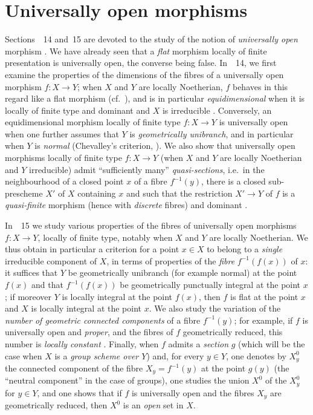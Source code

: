 \section{Universally open morphisms}
\label{section:IV.14}

Sections~\textsection\textsection~14 and~15 are devoted to the study of the notion of \emph{universally open} morphism .
We have already seen  that a \emph{flat} morphism locally of finite presentation is universally open, the converse being false.
In~\textsection~14, we first examine the properties of the dimensions of the fibres of a universally open morphism $f:X\to Y$; when $X$ and $Y$ are locally Noetherian, $f$ behaves in this regard  like a flat morphism (cf.~), and is in particular \emph{equidimensional} when it is locally of finite type and dominant and $X$ is irreducible .
Conversely, an equidimensional morphism locally of finite type $f:X\to Y$ is universally open when one further assumes that $Y$ is \emph{geometrically unibranch}, and in particular when $Y$ is \emph{normal} (Chevalley's criterion, ).
We also show that universally open morphisms locally of finite type $f:X\to Y$ (when $X$ and $Y$ are
locally Noetherian and $Y$ irreducible) admit ``sufficiently many'' \emph{quasi-sections}, i.e.\ in the neighbourhood of a closed point $x$ of a fibre $f^{-1}(y)$, there is a closed sub-prescheme $X'$ of $X$ containing $x$ and such that the restriction $X'\to Y$ of $f$ is a \emph{quasi-finite} morphism (hence with \emph{discrete} fibres) and dominant .

In~\textsection~15 we study various properties of the fibres of universally open morphisms $f:X\to Y$, locally of finite type, notably when $X$ and $Y$ are locally Noetherian.
We thus obtain in particular a criterion for a point $x\in X$ to belong to a \emph{single} irreducible component of $X$, in terms of properties of the \emph{fibre} $f^{-1}(f(x))$ of $x$: it suffices that $Y$ be geometrically unibranch (for example normal) at the point $f(x)$ and that $f^{-1}(f(x))$ be geometrically punctually integral at the point $x$ ; if moreover $Y$ is locally integral at the point $f(x)$, then $f$ is flat at the point $x$ and $X$ is locally integral at the point $x$.
We also study the variation of the \emph{number of geometric connected components} of a fibre $f^{-1}(y)$; for example, if $f$ is universally open and \emph{proper}, and the fibres of $f$ geometrically reduced, this number is \emph{locally constant} .
Finally, when $f$ admits a \emph{section} $g$ (which will be the case when $X$ is a \emph{group scheme over $Y$}) and, for every $y\in Y$, one denotes by $X_y^0$ the connected component of the fibre $X_y=f^{-1}(y)$ at the point $g(y)$ (the ``neutral component'' in the case of groups), one studies the union $X^0$ of the $X_y^0$ for $y\in Y$, and one shows  that if $f$ is universally open and the fibres $X_y$ are geometrically reduced, then $X^0$ is an \emph{open} set in $X$.

